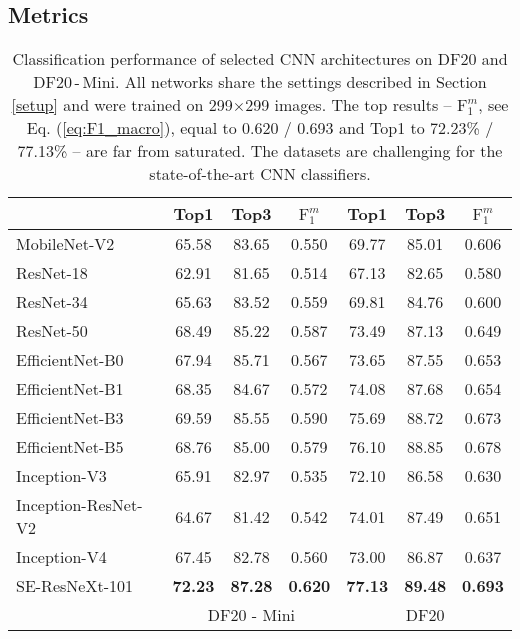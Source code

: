 \documentclass[10pt,twocolumn,letterpaper]{article}
\begin{document}
\subsection{Metrics}
\label{metrics}

\begin{table}[b]
\footnotesize
\begin{center}
\setlength{\tabcolsep}{0.3em} \renewcommand{\arraystretch}{1.17}
\begin{tabular}{|l| c | c | c || c | c | c |}
\cline{2-7}
    \multicolumn{1}{c|}{ } & \textbf{Top1} & \textbf{Top3} & \,\,\textbf{$\text{F}_{1}^{m}$}\,\, &  \textbf{Top1} & \textbf{Top3} & \,\,\textbf{$\text{F}_{1}^{m}$}\,\,  \\
    \hline
    MobileNet-V2          & \,65.58\, & \,83.65\, & \,0.550\, & \,69.77\, & \,85.01\, & \,0.606\, \\
    \hline 
	ResNet-18             & 62.91 & 81.65 & 0.514 & 67.13 & 82.65 & 0.580 \\
	ResNet-34             & 65.63 & 83.52 & 0.559 & 69.81 & 84.76 & 0.600 \\
	ResNet-50             & 68.49 & 85.22 & 0.587 & 73.49 & 87.13 & 0.649 \\
	\hline
	EfficientNet-B0       & 67.94 & 85.71 & 0.567 & 73.65 & 87.55 & 0.653 \\
	EfficientNet-B1       & 68.35 & 84.67 & 0.572 & 74.08 & 87.68 & 0.654 \\
	EfficientNet-B3       & 69.59 & 85.55 & 0.590 & 75.69 & 88.72 & 0.673 \\
	EfficientNet-B5       & 68.76 & 85.00 & 0.579 & 76.10 & 88.85 & 0.678 \\
	\hline 
	Inception-V3          & 65.91 & 82.97 & 0.535 & 72.10 & 86.58 & 0.630 \\
	Inception-ResNet-V2\, & 64.67 & 81.42 & 0.542 & 74.01 & 87.49 & 0.651 \\
	Inception-V4          & 67.45 & 82.78 & 0.560 & 73.00 & 86.87 & 0.637 \\ 
	\hline
	SE-ResNeXt-101 & \textbf{72.23} & \textbf{87.28} & \textbf{0.620} & \textbf{77.13} & \textbf{89.48} & \textbf{0.693} \\ \hline	
\multicolumn{1}{c}{ } & \multicolumn{3}{|c||}{DF20 - Mini} & \multicolumn{3}{c|}{DF20} \\
 \cline{2-7}
\end{tabular}
\end{center}
\caption{Classification performance of selected CNN architectures on DF20 and DF20\,-\,Mini. All networks share the settings described in Section \ref{setup} and were trained on 299$\times$299 images. The top results  -- $\text{F}_{1}^{m}$, see Eq. (\ref{eq:F1_macro}), equal to 0.620 / 0.693 and Top1 to 72.23\% / 77.13\% -- are far from saturated. The datasets are challenging for the state-of-the-art CNN classifiers.}
\label{table:results}
\end{table}
\end{document}
